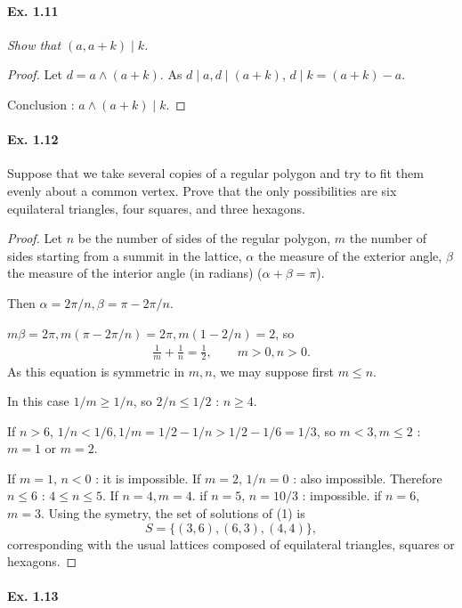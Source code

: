 \documentclass[11pt,a4paper]{article}
\begin{document}
{\paragraph{Ex. 1.11}

{\it Show that $(a, a+k)\mid k$.
}

\begin{proof} Let $d = a \wedge (a+k)$. As $d \mid a, d \mid (a+k)$, $d \mid k = (a+k) - a$. 

Conclusion : $a \wedge (a+k) \mid k.$
\end{proof}

 \paragraph{Ex. 1.12}

{\it

Suppose that we take several copies of a regular polygon and try to fit them evenly about a common vertex. Prove that the only possibilities are six equilateral triangles, four squares, and three hexagons.
}

\begin{proof}
Let $n$ be the number of sides of the regular polygon, $m$ the number of sides starting from a summit in the lattice, $\alpha$ the measure of the exterior angle, $\beta$ the measure of the interior angle (in radians) ($\alpha + \beta = \pi$).

Then $\alpha = 2\pi/n, \beta = \pi - 2\pi /n$.

$m\beta = 2\pi, m(\pi - 2 \pi /n) = 2 \pi, m(1-2/n) = 2$, so
\begin{align}
\frac{1}{m} + \frac{1}{n} = \frac{1}{2}, \qquad m>0,n>0.
\end{align}
As this equation is symmetric in $m,n$, we may suppose first $m\leq n$.

 In this case $1/m \geq 1/n$, so $2/n \leq 1/2$ : $n\geq 4$.
 
 If $n>6$, $1/n<1/6,1/m = 1/2 - 1/n > 1/2 -1/6 = 1/3$, so $m<3,m\leq 2$ : $m=1$ or $m=2$.

If $m=1$, $n<0$ : it is impossible. If $m=2$, $1/n = 0$ : also impossible. Therefore $n\leq 6$ : $4\leq n \leq 5$.
If $n = 4,m=4$. if $n = 5$, $n = 10/3$ : impossible. if $n=6$, $m=3$. 
Using the symetry, the set of solutions of (1) is
$$S = \{(3,6),(6,3),(4,4)\},$$
corresponding with the usual lattices composed of equilateral triangles, squares or hexagons.
\end{proof}

\paragraph{Ex. 1.13}

}
\end{document}

